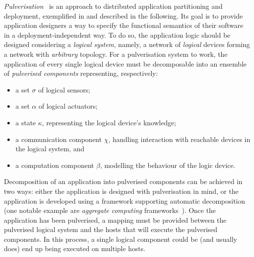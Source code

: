 \documentclass[conference]{IEEEtran}
\begin{document}
\emph{Pulverisation}~\cite{FI2020-pulverization,IEEE-IoTJ-pulverization-simulation}
 is an approach to distributed application partitioning
 and deployment, exemplified in  and described in the following.
%
Its goal 
 is to provide application designers a way to specify the functional semantics of their software in a deployment-independent way.
%
To do so,
the application logic should be designed considering a \emph{logical system},
namely, a network of \emph{logical} devices forming a network with \emph{arbitrary} topology.
%
For a pulverisation system to work,
the application of every single logical device must be decomposable into an ensemble of \emph{pulverised components}
representing, respectively:
\begin{itemize}
    \item a set $\sigma$ of logical sensors;
    \item a set $\alpha$ of logical actuators;
    \item a state $\kappa$, representing the logical device's knowledge;
    \item a communication component $\chi$,
    handling interaction with reachable devices in the logical system, and
    \item a computation component $\beta$, modelling the behaviour of the logic device.
\end{itemize}
%
Decomposition of an application into pulverised components can be achieved in two ways:
either the application is designed with pulverisation in mind,
or the application is developed using a framework supporting automatic decomposition
(one notable example are \emph{aggregate computing} frameworks~\cite{BealIEEEComputer2015,JLAMP2019}).
%
Once the application has been pulverised,
a mapping must be provided between the pulverised logical system and the hosts that will execute the pulverised components.
%
In this process,
a single logical component could be (and usually does) end up being executed on multiple hosts.
\end{document}
